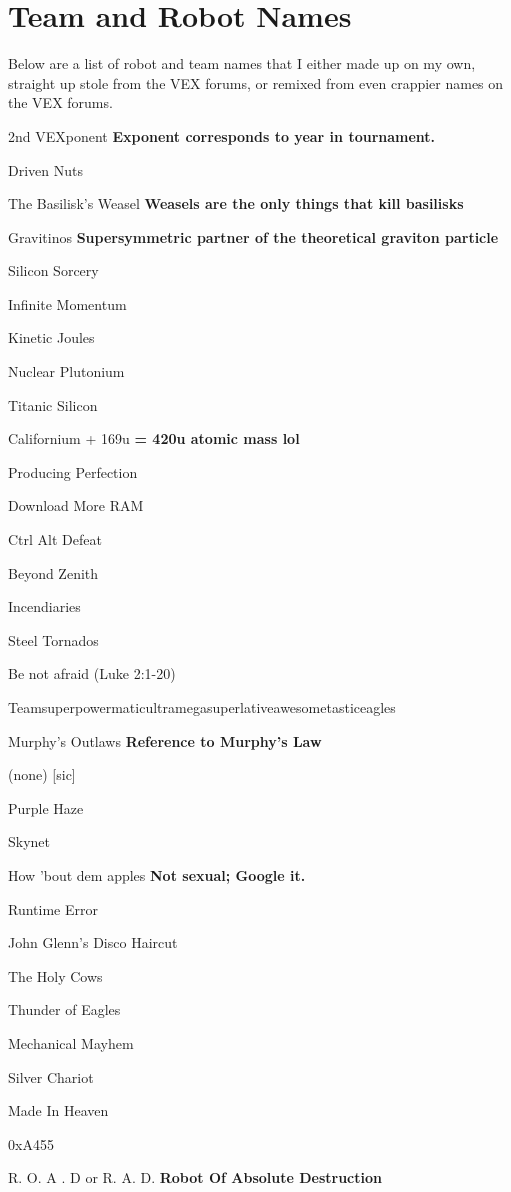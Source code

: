 \section{Team and Robot Names}

Below are a list of robot and team names that I either made up on my own, straight up stole from the VEX forums, or remixed from even crappier names on the VEX forums.


2nd VEXponent \textbf{Exponent corresponds to year in tournament.}

Driven Nuts

The Basilisk’s Weasel \textbf{Weasels are the only things that kill basilisks}

Gravitinos \textbf{Supersymmetric partner of the theoretical graviton particle}

Silicon Sorcery

Infinite Momentum

Kinetic Joules

Nuclear Plutonium

Titanic Silicon

Californium + 169u \textbf{= 420u atomic mass lol}

Producing Perfection

Download More RAM

Ctrl Alt Defeat

Beyond Zenith

Incendiaries

Steel Tornados

Be not afraid (Luke 2:1-20)

Teamsuperpowermaticultramegasuperlativeawesometasticeagles

Murphy’s Outlaws \textbf{Reference to Murphy's Law}

(none) [sic]

Purple Haze

Skynet

How 'bout dem apples \textbf{Not sexual; Google it.}

Runtime Error

John Glenn’s Disco Haircut

The Holy Cows

Thunder of Eagles

Mechanical Mayhem

Silver Chariot

Made In Heaven

0xA455

R. O. A . D  or R. A. D. \textbf{Robot Of Absolute Destruction}
